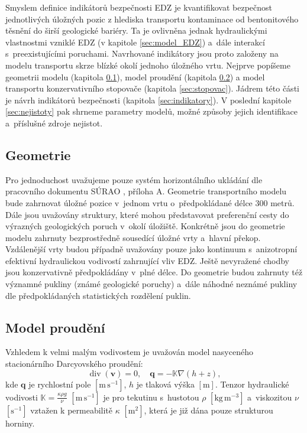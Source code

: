 \documentclass{article}
\def\unit#1{\mathrm{#1}}
\def\grad{\nabla}
\def\div{\operatorname{div}}
\def\vc#1{\mathbf{\boldsymbol{#1}}}     %
\def\tn#1{{\mathbb{#1}}}    %
\begin{document}
Smyslem definice indikátorů bezpečnosti EDZ je kvantifikovat bezpečnost jednotlivých úložných pozic z hlediska 
transportu kontaminace od bentonitového těsnění do širší geologické bariéry. Ta je ovlivněna jednak hydraulickými vlastnostmi
vzniklé EDZ (v kapitole \ref{sec:model_EDZ}) a~dále interakcí s~preexistujícími poruchami. 
Navrhované indikátory jsou proto založeny na modelu transportu skrze blízké okolí jednoho úložného vrtu. 
Nejprve popíšeme geometrii modelu (kapitola  \ref{sec:transport_geometrie}), model proudění (kapitola \ref{sec:transport_flow})
a model transportu konzervativního stopovače (kapitola \ref{sec:stopovac}). Jádrem této části je návrh indikátorů bezpečnosti (kapitola \ref{sec:indikatory}). 
V poslední kapitole \ref{sec:nejistoty} pak shrneme parametry modelů, možné způsoby jejich identifikace a~příslušné zdroje nejistot.



\subsection{Geometrie}
\label{sec:transport_geometrie}
 Pro jednoduchost uvažujeme pouze systém horizontálního ukládání dle pracovního dokumentu SÚRAO , příloha A. 
 Geometrie transportního modelu bude zahrnovat úložné pozice v~jednom vrtu o~předpokládané délce 300 metrů. 
 Dále jsou uvažovány  struktury, které mohou představovat preferenční cesty do výrazných geologických poruch v~okolí úložiště. 
 Konkrétně jsou do geometrie modelu zahrnuty bezprostředně sousedící úložné vrty a~hlavní překop. Vzdálenější vrty budou případně 
 uvažovány pouze jako kontinuum s~anizotropní efektivní hydraulickou vodivostí zahrnující vliv EDZ. 
Ještě nevyražené chodby jsou konzervativně předpokládány v~plné délce. Do geometrie budou zahrnuty též významné pukliny 
(známé geologické poruchy) a~dále náhodné neznámé pukliny dle předpokládaných statistických rozdělení puklin.


\subsection{Model proudění}
\label{sec:transport_flow}
Vzhledem k velmi malým vodivostem je uvažován model nasyceného stacionárního Darcyovského proudění:
\[
    \div(\vc v) = 0, \quad \vc q = -\tn K \grad (h + z),
\]
kde $\vc q$ je rychlostní pole $[\unit{m\,s^{-1}}]$, $h$ je tlaková výška $[\unit{m}]$. Tenzor hydraulické vodivosti $\tn K =\frac{\kappa \rho g}{\nu}$
 $[\unit{m\,s^{-1}}]$ je pro tekutinu s~hustotou $\rho$ $[\unit{kg\, m^{-3}}]$ a~viskozitou $\nu$ $[\unit{s^{-1}}]$ vztažen k permeabilitě $\kappa$ $[\unit{m^2}]$, která je již dána pouze strukturou horniny.
\end{document}
